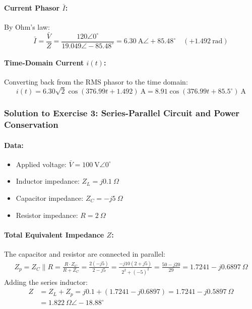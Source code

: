 \paragraph{Current Phasor $\bar{I}$:}
By Ohm's law:
\begin{equation}
    \bar{I} = \frac{\bar{V}}{Z} = \frac{120\angle 0^\circ}{19.049\angle -85.48^\circ} = 6.30\ \text{A} \angle +85.48^\circ\quad (+1.492\ \text{rad})
\end{equation}

\paragraph{Time-Domain Current $i(t)$:}
Converting back from the RMS phasor to the time domain:
\begin{equation}
    \boxed{i(t) = 6.30\sqrt{2} \cos(376.99 t + 1.492)\ \text{A} = 8.91 \cos(376.99 t + 85.5^\circ)\ \text{A}}
\end{equation}

\subsubsection*{Solution to Exercise 3: Series-Parallel Circuit and Power Conservation}
\paragraph{Data:}
\begin{itemize}
    \item Applied voltage: $\bar{V} = 100\ \text{V} \angle 0^\circ$
    \item Inductor impedance: $Z_L = j0.1\ \Omega$
    \item Capacitor impedance: $Z_C = -j5\ \Omega$
    \item Resistor impedance: $R = 2\ \Omega$
\end{itemize}

\paragraph{Total Equivalent Impedance $Z$:}
The capacitor and resistor are connected in parallel:
\begin{align}
    Z_p = Z_C \parallel R = \frac{R \cdot Z_C}{R + Z_C} = \frac{2(-j5)}{2 - j5} = \frac{-j10(2 + j5)}{2^2 + (-5)^2} = \frac{50 - j20}{29} = 1.7241 - j0.6897\ \Omega
\end{align}
Adding the series inductor:
\begin{align}
    Z &= Z_L + Z_p = j0.1 + (1.7241 - j0.6897) = 1.7241 - j0.5897\ \Omega \nonumber\\
      &= 1.822\ \Omega \angle -18.88^\circ
\end{align}

